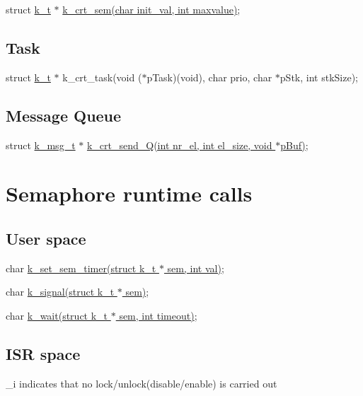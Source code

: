 \begin{DoxyItemize}
\item struct \hyperlink{structk__t}{k\+\_\+t} $\ast$ \hyperlink{krnl_8h_a27f33ac31a1b04e73084d19333e10486}{k\+\_\+crt\+\_\+sem(char init\+\_\+val, int maxvalue)}; 
\end{DoxyItemize}\hypertarget{index_a42}{}\subsection{Task}\label{index_a42}

\begin{DoxyItemize}
\item struct \hyperlink{structk__t}{k\+\_\+t} $\ast$ k\+\_\+crt\+\_\+task(void ($\ast$p\+Task)(void), char prio, char $\ast$p\+Stk, int stk\+Size); 
\end{DoxyItemize}\hypertarget{index_a43}{}\subsection{Message Queue}\label{index_a43}

\begin{DoxyItemize}
\item struct \hyperlink{structk__msg__t}{k\+\_\+msg\+\_\+t} $\ast$ \hyperlink{krnl_8h_a8ad6ae5f7e3cac59845df0de94e55c68}{k\+\_\+crt\+\_\+send\+\_\+\+Q(int nr\+\_\+el, int el\+\_\+size, void $\ast$p\+Buf)};
\end{DoxyItemize}\hypertarget{index_a55}{}\section{Semaphore runtime calls}\label{index_a55}
\hypertarget{index_a5}{}\subsection{User space}\label{index_a5}

\begin{DoxyItemize}
\item char \hyperlink{krnl_8h_aa6aa0c34f3e3b21e906a765498ee02b2}{k\+\_\+set\+\_\+sem\+\_\+timer(struct k\+\_\+t $\ast$ sem, int val)};
\item char \hyperlink{krnl_8h_a0c2f743e45400c5d9ac04457b78d3d97}{k\+\_\+signal(struct k\+\_\+t $\ast$ sem)};
\item char \hyperlink{krnl_8h_a7f65c7a1cbda113524b3009faf639357}{k\+\_\+wait(struct k\+\_\+t $\ast$ sem, int timeout)};
\end{DoxyItemize}\hypertarget{index_a51}{}\subsection{I\+S\+R space}\label{index_a51}
\+\_\+i indicates that no lock/unlock(disable/enable) is carried out


